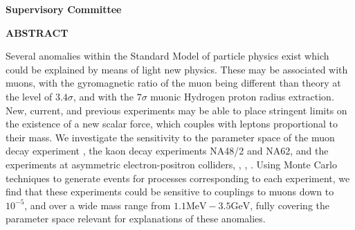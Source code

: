 \newpage
{}

\noindent \textbf{Supervisory Committee}
\tpbreak
\panel

\begin{center}
\textbf{ABSTRACT}
\end{center}

Several anomalies within the Standard Model of particle physics exist which could be explained by means of light new physics.
These may be associated with muons, with the gyromagnetic ratio of the muon being different than theory at the level of $3.4\sigma$, and with the $7\sigma$ muonic Hydrogen proton radius extraction.
New, current, and previous experiments may be able to place stringent limits on the existence of a new scalar force, which couples with leptons proportional to their mass.
We investigate the sensitivity to the parameter space of the muon decay experiment \mueee, the kaon decay experiments NA48/2 and NA62, and the experiments at asymmetric electron-positron colliders, \babar, \belle, \belletwo.
Using Monte Carlo techniques to generate events for processes corresponding to each experiment, we find that these experiments could be sensitive to couplings to muons down to $10^{-5}$, and over a wide mass range from $1.1\textrm{MeV} - 3.5\textrm{GeV}$, fully covering the parameter space relevant for explanations of these anomalies.
